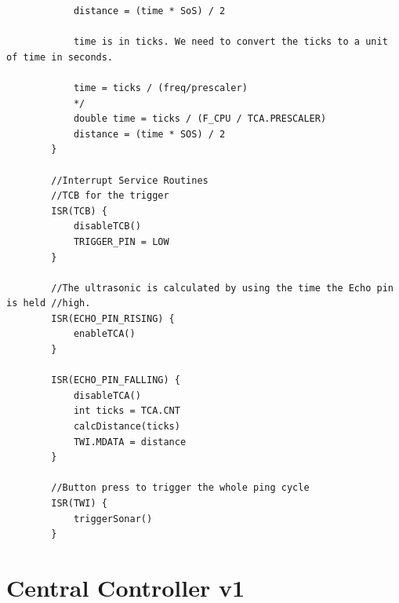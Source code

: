 \documentclass[11pt,a4paper,titlepage]{report}
\begin{document}
\begin{lstlisting}
			distance = (time * SoS) / 2
			
			time is in ticks. We need to convert the ticks to a unit of time in seconds.
			
			time = ticks / (freq/prescaler) 
			*/
			double time = ticks / (F_CPU / TCA.PRESCALER)
			distance = (time * SOS) / 2
		}
		
		//Interrupt Service Routines
		//TCB for the trigger
		ISR(TCB) {
			disableTCB()
			TRIGGER_PIN = LOW
		}
		
		//The ultrasonic is calculated by using the time the Echo pin is held //high.
		ISR(ECHO_PIN_RISING) {
			enableTCA()
		}
		
		ISR(ECHO_PIN_FALLING) {
			disableTCA()
			int ticks = TCA.CNT
			calcDistance(ticks)
			TWI.MDATA = distance
		}
		
		//Button press to trigger the whole ping cycle
		ISR(TWI) {
			triggerSonar()
		}
	\end{lstlisting}
	
	\section{Central Controller v1} \label{pseudocode:central_controller_v1}
	
\end{document}
